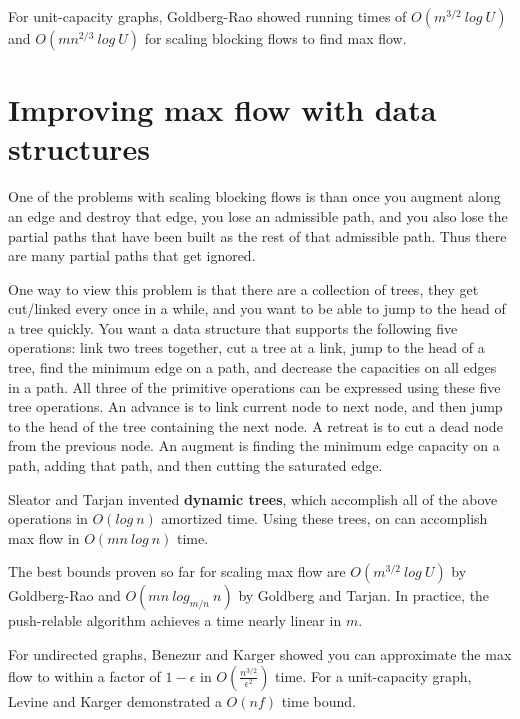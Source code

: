 \documentclass{article}
\begin{document}
For unit-capacity graphs, Goldberg-Rao showed running times of $O(m^{3/2}\  log\ U)$ and $O(m{n^{2/3}} \ log\ U)$ for scaling blocking flows to find max flow.

\section{Improving max flow with data structures}

One of the problems with scaling blocking flows is than once you augment along an edge and destroy that edge, you lose an admissible path, and you also lose the partial paths that have been built as the rest of that admissible path.  Thus there are many partial paths that get ignored. 

One way to view this problem is that there are a collection of trees, they get cut/linked every once in a
while, and you want to be able to jump to the head of a tree quickly.  You want a data structure that supports the following five operations: link two trees together, cut a tree at a link, jump to the head of a tree, find the minimum edge on a path, and decrease the capacities on all edges in a path.  All three of the primitive operations can be expressed using these five tree operations.  An advance is to link current node to next node, and then jump to the head of the tree containing the next node.  A retreat is to cut a dead node from the previous node.  An augment is finding the minimum edge capacity on a path, adding that path, and then cutting the saturated edge.  

Sleator and Tarjan invented {\bf{dynamic trees}}, which accomplish all of the above operations in $O(log\ n)$ amortized time.  Using these trees, on can accomplish max flow in $O(mn\ log\ n)$ time.

The best bounds proven so far for scaling max flow are $O(m^{3/2}\ log \ U)$ by Goldberg-Rao and
 $O(mn \ log_{m/n}\ n)$ by Goldberg and Tarjan.  In practice, the push-relable algorithm achieves a time nearly linear in $m$.


For undirected graphs, Benezur and Karger showed you can approximate the max flow to within a factor of $1 - \epsilon $ in $O(\frac{n^{3/2}}{\epsilon ^2})$ time.  For a unit-capacity graph, Levine and Karger demonstrated a $O(nf)$ time bound.
\end{document}
